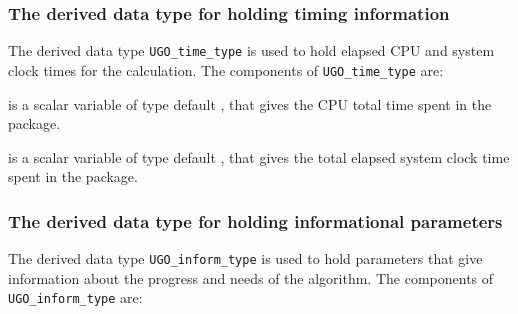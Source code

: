 \documentclass{galahad}
\newcommand{\packagename}{UGO}
\begin{document}
\subsubsection{The derived data type for holding timing
 information}\label{typetime}
The derived data type
{\tt \packagename\_time\_type}
is used to hold elapsed CPU and system clock times for the calculation.
The components of
{\tt \packagename\_time\_type}
are:
\begin{description}
 is a scalar variable of type default \real, that gives
 the CPU total time spent in the package.

 is a scalar variable of type default \real, that gives
 the total elapsed system clock time spent in the package.

\end{description}


\subsubsection{The derived data type for holding informational
 parameters}\label{typeinform}
The derived data type
{\tt \packagename\_inform\_type}
is used to hold parameters that give information about the progress and needs
of the algorithm. The components of
{\tt \packagename\_inform\_type}
are:
\end{document}
